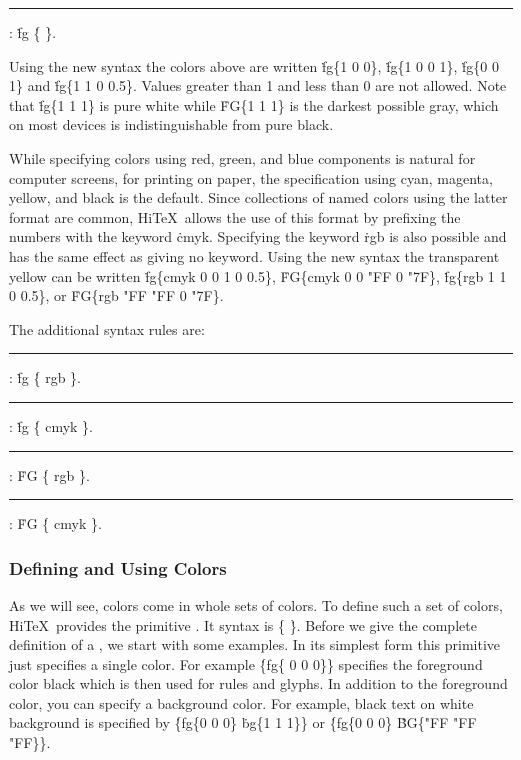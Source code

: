 \medskip
\rule{}:
\.{fg} \.{\{}     \.{\}}.
\medskip

Using the new syntax the colors above are written
\.{fg\{1 0 0\}}, \.{fg\{1 0 0 1\}},
\.{fg\{0 0 1\}} and \.{fg\{1 1 0 0.5\}}.
Values greater than 1 and less than 0 are not allowed.
Note that \.{fg\{1 1 1\}} is pure white while  \.{FG\{1 1 1\}} is
the darkest possible gray, which on most devices is indistinguishable
from pure black.

While specifying colors using red, green, and blue components is natural for
computer screens, for printing on paper, the specification using cyan, magenta, yellow,
and black is the default. Since collections of named colors using the latter format
are common, Hi\TeX\ allows the use of this format by prefixing the numbers with
the keyword \.{cmyk}. Specifying the keyword \.{rgb} is also possible and has the
same effect as giving no keyword. Using the new syntax the transparent yellow
can be written \.{fg\{cmyk 0 0 1 0 0.5\}},  \.{FG\{cmyk 0 0 "FF 0 "7F\}},
 \.{fg\{rgb 1 1 0 0.5\}}, or \.{FG\{rgb "FF "FF 0 "7F\}}.

The additional syntax rules are:

\medskip
\rule{}:
\.{fg} \.{\{ rgb}     \.{\}}.
\rule{}:
\.{fg} \.{\{ cmyk}      \.{\}}.
\rule{}:
   \.{FG} \.{\{ rgb}     \.{\}}.
\rule{}:
   \.{FG} \.{\{ cmyk}      \.{\}}.
\medskip




\subsubsection{Defining and Using Colors}
As we will see, colors come in whole sets of colors.
To define such a set of colors, Hi\TeX\ provides
the primitive . It syntax is
\medskip
\prim{} \.{\{}  \.{\}}.
\medskip
Before we give the complete definition of a  ,
we start with some examples.
In its simplest form this primitive just specifies a single color.
For example \.{\{fg\{ 0 0 0\}\}} specifies
the foreground color black which is then used for rules and glyphs.
In addition to the foreground color, you can specify a background color.
For example, black text on white background is specified by
\.{\{fg\{0 0 0\}} \.{bg\{1 1 1\}\}} or
\.{\{fg\{0 0 0\}} \.{BG\{"FF "FF "FF\}\}}.

